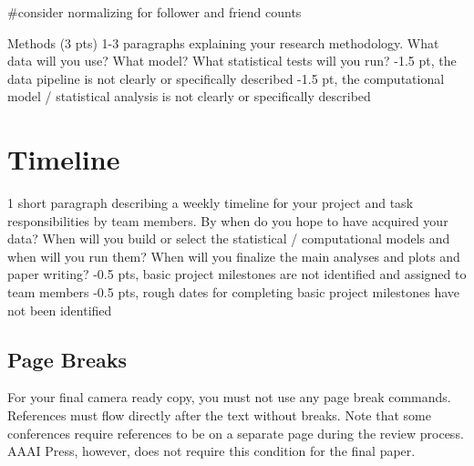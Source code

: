 \documentclass[letterpaper]{article} %
\begin{document}
#consider normalizing for follower and friend counts

Methods (3 pts)
1-3 paragraphs explaining your research methodology. What data will you use? What model? What statistical tests will you run?
-1.5 pt, the data pipeline is not clearly or specifically described 
-1.5 pt, the computational model / statistical analysis is not clearly or specifically described 




\section{Timeline}
1 short paragraph describing a weekly timeline for your project and task responsibilities by team members. By when do you hope to have acquired your data? When will you build or select the statistical / computational models and when will you run them? When will you finalize the main analyses and plots and paper writing? 
-0.5 pts, basic project milestones are not identified and assigned to team members
-0.5 pts, rough dates for completing basic project milestones have not been identified




\subsection{Page Breaks}
For your final camera ready copy, you must not use any page break commands. References must flow directly after the text without breaks. Note that some conferences require references to be on a separate page during the review process. AAAI Press, however, does not require this condition for the final paper.


\end{document}
